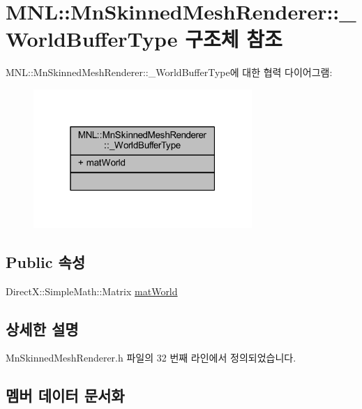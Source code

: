 \hypertarget{struct_m_n_l_1_1_mn_skinned_mesh_renderer_1_1___world_buffer_type}{}\section{M\+NL\+:\+:Mn\+Skinned\+Mesh\+Renderer\+:\+:\+\_\+\+World\+Buffer\+Type 구조체 참조}
\label{struct_m_n_l_1_1_mn_skinned_mesh_renderer_1_1___world_buffer_type}


M\+NL\+:\+:Mn\+Skinned\+Mesh\+Renderer\+:\+:\+\_\+\+World\+Buffer\+Type에 대한 협력 다이어그램\+:\nopagebreak
\begin{figure}[H]
\begin{center}
\leavevmode
\includegraphics[width=235pt]{struct_m_n_l_1_1_mn_skinned_mesh_renderer_1_1___world_buffer_type__coll__graph}
\end{center}
\end{figure}
\subsection*{Public 속성}
\begin{DoxyCompactItemize}
\item 
Direct\+X\+::\+Simple\+Math\+::\+Matrix \hyperlink{struct_m_n_l_1_1_mn_skinned_mesh_renderer_1_1___world_buffer_type_a5c8d2b6785f90aa08047ab32dcfbe257}{mat\+World}
\end{DoxyCompactItemize}


\subsection{상세한 설명}


Mn\+Skinned\+Mesh\+Renderer.\+h 파일의 32 번째 라인에서 정의되었습니다.



\subsection{멤버 데이터 문서화}
\mbox{\label{struct_m_n_l_1_1_mn_skinned_mesh_renderer_1_1___world_buffer_type_a5c8d2b6785f90aa08047ab32dcfbe257}} 
